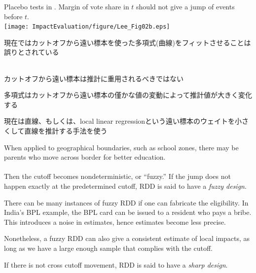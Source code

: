 \begin{frame}{}
Placebo tests in \citet{Lee2008}. Margin of vote share in $t$ should not give a jump of events before $t$.\\
\hfil\texttt{[image: ImpactEvaluation/figure/Lee\_Fig02b.eps]}
\end{frame}

\begin{frame}{}
現在ではカットオフから遠い標本を使った多項式(曲線)をフィットさせることは誤りとされている\\~\\
\begin{dinglist}{45}
\vspace{1.0ex}\setlength{\itemsep}{1.0ex}\setlength{\baselineskip}{12pt}
\item	カットオフから遠い標本は推計に重用されるべきではない
\item	多項式はカットオフから遠い標本の僅かな値の変動によって推計値が大きく変化する
\end{dinglist}

\vspace*{2ex}
現在は直線、もしくは、local linear regressionという遠い標本のウェイトを小さくして直線を推計する手法を使う
\end{frame}

\begin{frame}{}
When applied to geographical boundaries, such as school zones, there may be parents who move across border for better education.\\~\\

\pause
Then the cutoff becomes nondeterministic, or ``fuzzy.'' If the jump does not happen exactly at the predetermined cutoff, RDD is said to have a \textit{fuzzy design}. 
\begin{dinglist}{43}
\vspace{1.0ex}\setlength{\itemsep}{1.0ex}\setlength{\baselineskip}{12pt}
\pause
\item	There can be many instances of fuzzy RDD if one can fabricate the eligibility. In India's BPL example, the BPL card can be issued to a resident who pays a bribe. This introduces a noise in estimates, hence estimates become less precise.
\pause
\item	Nonetheless, a fuzzy RDD can also give a consistent estimate of local impacts, as long as we have a large enough sample that complies with the cutoff.
\end{dinglist}

\pause
If there is not cross cutoff movement, RDD is said to have a \textit{sharp design}.
\end{frame}


